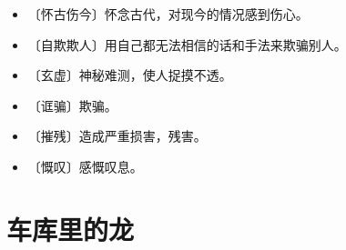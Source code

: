 \documentclass[12pt,UTF-8,openany]{ctexbook}
\begin{document}
\begin{itemize}
    \setlength\itemsep{-0.2em}
    \item 〔怀古伤今〕怀念古代，对现今的情况感到伤心。
    \item 〔自欺欺人〕用自己都无法相信的话和手法来欺骗别人。
    \item 〔玄虚〕神秘难测，使人捉摸不透。
    \item 〔诓骗〕欺骗。
    \item 〔摧残〕造成严重损害，残害。
    \item 〔慨叹〕感慨叹息。
\end{itemize}

\chapter{车库里的龙}
\end{document}
